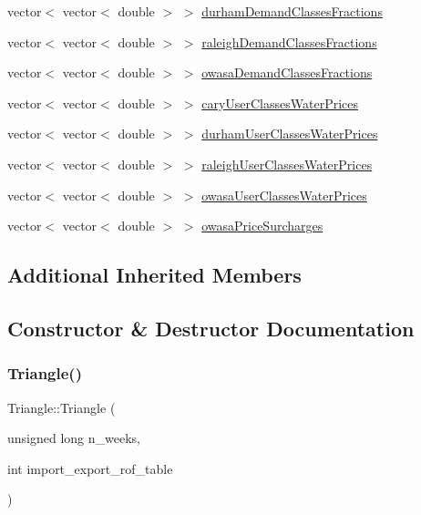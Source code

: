 \begin{DoxyCompactItemize}
\item 
vector$<$ vector$<$ double $>$ $>$ \mbox{\hyperlink{classTriangle_a276e7bb08c7fb20aa0dc6fe256cef46d_a276e7bb08c7fb20aa0dc6fe256cef46d}{durham\+Demand\+Classes\+Fractions}}
\item 
vector$<$ vector$<$ double $>$ $>$ \mbox{\hyperlink{classTriangle_abf4c57a8823a6f1af7ce08c467cec491_abf4c57a8823a6f1af7ce08c467cec491}{raleigh\+Demand\+Classes\+Fractions}}
\item 
vector$<$ vector$<$ double $>$ $>$ \mbox{\hyperlink{classTriangle_af2243c78316c4f0afc1535d35aef182c_af2243c78316c4f0afc1535d35aef182c}{owasa\+Demand\+Classes\+Fractions}}
\item 
vector$<$ vector$<$ double $>$ $>$ \mbox{\hyperlink{classTriangle_afdd592d6d1c494ac598aa293fc99bed5_afdd592d6d1c494ac598aa293fc99bed5}{cary\+User\+Classes\+Water\+Prices}}
\item 
vector$<$ vector$<$ double $>$ $>$ \mbox{\hyperlink{classTriangle_ab1b016ce397014e287ae5a213b04643d_ab1b016ce397014e287ae5a213b04643d}{durham\+User\+Classes\+Water\+Prices}}
\item 
vector$<$ vector$<$ double $>$ $>$ \mbox{\hyperlink{classTriangle_a626cdfe51d52c966bda22de9afc237f7_a626cdfe51d52c966bda22de9afc237f7}{raleigh\+User\+Classes\+Water\+Prices}}
\item 
vector$<$ vector$<$ double $>$ $>$ \mbox{\hyperlink{classTriangle_a8501e1edfb25770f4f06fc9e57e274c2_a8501e1edfb25770f4f06fc9e57e274c2}{owasa\+User\+Classes\+Water\+Prices}}
\item 
vector$<$ vector$<$ double $>$ $>$ \mbox{\hyperlink{classTriangle_ae6fc047b9fb03b541036b0e8c6affba1_ae6fc047b9fb03b541036b0e8c6affba1}{owasa\+Price\+Surcharges}}
\end{DoxyCompactItemize}
\subsection*{Additional Inherited Members}


\subsection{Constructor \& Destructor Documentation}
\mbox{\label{classTriangle_a24833bad242ddc3f671b36678dff5738_a24833bad242ddc3f671b36678dff5738}} 
\subsubsection{\texorpdfstring{Triangle()}{Triangle()}}
{\footnotesize\ttfamily Triangle\+::\+Triangle (\begin{DoxyParamCaption}\item[{unsigned long}]{n\+\_\+weeks,  }\item[{int}]{import\+\_\+export\+\_\+rof\+\_\+table }\end{DoxyParamCaption})}

